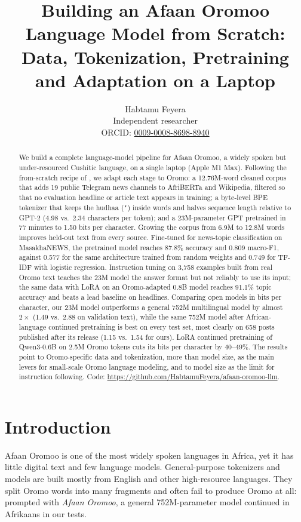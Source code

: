 \documentclass[11pt]{article}
\title{Building an Afaan Oromoo Language Model from Scratch:\\Data, Tokenization, Pretraining and Adaptation on a Laptop}
\author{Habtamu Feyera \\
  Independent researcher \\
  ORCID: \href{https://orcid.org/0009-0008-8698-8940}{0009-0008-8698-8940}
}
\newcommand{\om}[1]{\textit{#1}}
\begin{document}
\maketitle

\begin{abstract}
We build a complete language-model pipeline for Afaan Oromoo, a widely spoken but under-resourced Cushitic language, on a single laptop (Apple M1 Max). Following the from-scratch recipe of \citet{raschka2025build}, we adapt each stage to Oromo: a 12.76M-word cleaned corpus that adds 19 public Telegram news channels to AfriBERTa and Wikipedia, filtered so that no evaluation headline or article text appears in training; a byte-level BPE tokenizer that keeps the hudhaa (\texttt{'}) inside words and halves sequence length relative to GPT-2 (4.98 vs.\ 2.34 characters per token); and a 23M-parameter GPT pretrained in 77 minutes to 1.50 bits per character. Growing the corpus from 6.9M to 12.8M words improves held-out text from every source.
Fine-tuned for news-topic classification on MasakhaNEWS, the pretrained model reaches 87.8\% accuracy and 0.809 macro-F1, against 0.577 for the same architecture trained from random weights and 0.749 for TF-IDF with logistic regression. Instruction tuning on 3,758 examples built from real Oromo text teaches the 23M model the answer format but not reliably to use its input; the same data with LoRA on an Oromo-adapted 0.8B model reaches 91.1\% topic accuracy and beats a lead baseline on headlines.
Comparing open models in bits per character, our 23M model outperforms a general 752M multilingual model by almost $2\times$ (1.49 vs.\ 2.88 on validation text), while the same 752M model after African-language continued pretraining is best on every test set, most clearly on 658 posts published after its release (1.15 vs.\ 1.54 for ours). LoRA continued pretraining of Qwen3-0.6B on 2.5M Oromo tokens cuts its bits per character by 40--49\%. The results point to Oromo-specific data and tokenization, more than model size, as the main levers for small-scale Oromo language modeling, and to model size as the limit for instruction following. Code: \url{https://github.com/HabtamuFeyera/afaan-oromoo-llm}.
\end{abstract}

\section{Introduction}

Afaan Oromoo is one of the most widely spoken languages in Africa, yet it has little digital text and few language models. General-purpose tokenizers and models are built mostly from English and other high-resource languages. They split Oromo words into many fragments and often fail to produce Oromo at all: prompted with \om{Afaan Oromoo}, a general 752M-parameter model continued in Afrikaans in our tests.
\end{document}
